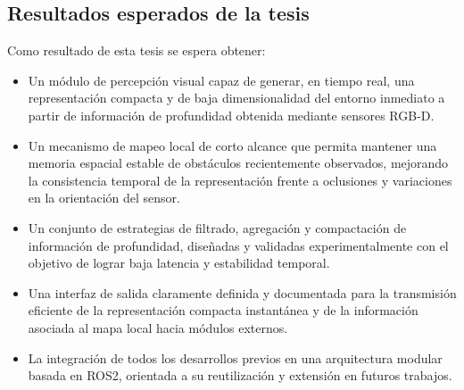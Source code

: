 \subsection{Resultados esperados de la tesis}

Como resultado de esta tesis se espera obtener:

\begin{itemize}
    \item Un módulo de percepción visual capaz de generar, en tiempo real, una representación compacta y
    de baja dimensionalidad del entorno inmediato a partir de información de profundidad obtenida mediante sensores RGB-D.

    \item Un mecanismo de mapeo local de corto alcance que permita mantener una memoria espacial estable de
    obstáculos recientemente observados, mejorando la consistencia temporal de la representación frente a
    oclusiones y variaciones en la orientación del sensor.

    \item Un conjunto de estrategias de filtrado, agregación y compactación de información de profundidad,
    diseñadas y validadas experimentalmente con el objetivo de lograr baja latencia y estabilidad temporal.

    \item Una interfaz de salida claramente definida y documentada para la transmisión eficiente de la representación
    compacta instantánea y de la información asociada al mapa local hacia módulos externos.

    \item La integración de todos los desarrollos previos en una arquitectura modular basada en ROS2, orientada a su
    reutilización y extensión en futuros trabajos.
\end{itemize}
